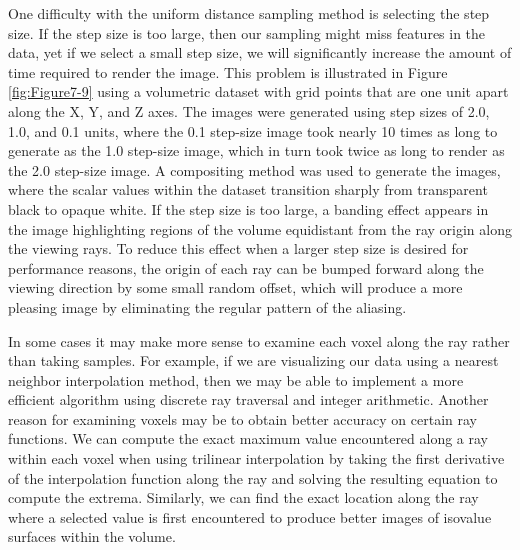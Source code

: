 One difficulty with the uniform distance sampling method is selecting the step size. If the step size is too large, then our sampling might miss features in the data, yet if we select a small step size, we will significantly increase the amount of time required to render the image. This problem is illustrated in Figure \ref{fig:Figure7-9} using a volumetric dataset with grid points that are one unit apart along the X, Y, and Z axes. The images were generated using step sizes of 2.0, 1.0, and 0.1 units, where the 0.1 step-size image took nearly 10 times as long to generate as the 1.0 step-size image, which in turn took twice as long to render as the 2.0 step-size image. A compositing method was used to generate the images, where the scalar values within the dataset transition sharply from transparent black to opaque white. If the step size is too large, a banding effect appears in the image highlighting regions of the volume equidistant from the ray origin along the viewing rays. To reduce this effect when a larger step size is desired for performance reasons, the origin of each ray can be bumped forward along the viewing direction by some small random offset, which will produce a more pleasing image by eliminating the regular pattern of the aliasing.

In some cases it may make more sense to examine each voxel along the ray rather than taking samples. For example, if we are visualizing our data using a nearest neighbor interpolation method, then we may be able to implement a more efficient algorithm using discrete ray traversal and integer arithmetic. Another reason for examining voxels may be to obtain better accuracy on certain ray functions. We can compute the exact maximum value encountered along a ray within each voxel when using trilinear interpolation by taking the first derivative of the interpolation function along the ray and solving the resulting equation to compute the extrema. Similarly, we can find the exact location along the ray where a selected value is first encountered to produce better images of isovalue surfaces within the volume.

